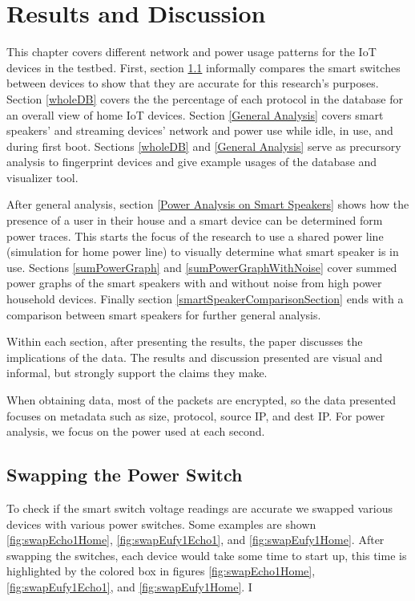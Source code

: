 \chapter{Results and Discussion}
\label{Results}
This chapter covers different network and power usage patterns for the IoT devices in the testbed. First, section \ref{swappingSwitch} informally compares the smart switches between devices to show that they are accurate for this research's purposes. Section \ref{wholeDB} covers the the percentage of each protocol in the database for an overall view of home IoT devices. Section \ref{General Analysis} covers smart speakers' and streaming devices' network and power use while idle, in use, and during first boot. Sections \ref{wholeDB} and \ref{General Analysis} serve as precursory analysis to fingerprint devices and give example usages of the database and visualizer tool.

After general analysis, section \ref{Power Analysis on Smart Speakers} shows how the presence of a user in their house and a smart device can be determined form power traces. This starts the focus of the research to use a shared power line (simulation for home power line) to visually determine what smart speaker is in use. Sections \ref{sumPowerGraph} and \ref{sumPowerGraphWithNoise} cover summed power graphs of the smart speakers with and without noise from high power household devices. Finally section \ref{smartSpeakerComparisonSection} ends with a comparison between smart speakers for further general analysis.

Within each section, after presenting the results, the paper discusses the implications of the data. The results and discussion presented are visual and informal, but strongly support the claims they make.

When obtaining data, most of the packets are encrypted, so the data presented focuses on metadata such as size, protocol, source IP, and dest IP. For power analysis, we focus on the power used at each second.

\section{Swapping the Power Switch}
\label{swappingSwitch}
To check if the smart switch voltage readings are accurate we swapped various devices with various power switches. Some examples are shown \ref{fig:swapEcho1Home}, \ref{fig:swapEufy1Echo1}, and \ref{fig:swapEufy1Home}. After swapping the switches, each device would take some time to start up, this time is highlighted by the colored box in figures \ref{fig:swapEcho1Home}, \ref{fig:swapEufy1Echo1}, and \ref{fig:swapEufy1Home}. I

